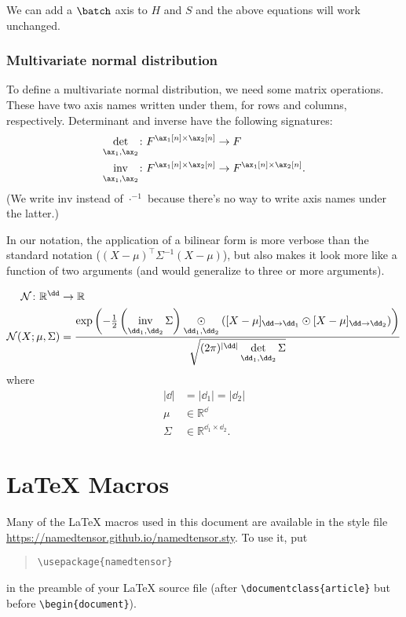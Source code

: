 \documentclass{article}
\newcommand{\reals}{\mathbb{R}}
\begin{document}
We can add a $\batch$ axis to $H$ and $S$ and the above equations will work unchanged.

\subsubsection{Multivariate normal distribution}

To define a multivariate normal distribution, we need some matrix operations. These have two axis names written under them, for rows and columns, respectively. Determinant and inverse have the following signatures:
\begin{align*}
\nfun{\ax_1,\ax_2}{det} \colon F^{\ax_1[n] \times \ax_2[n]} &\rightarrow F \\
\nfun{\ax_1,\ax_2}{inv} \colon F^{\ax_1[n] \times \ax_2[n]} &\rightarrow F^{\ax_1[n] \times \ax_2[n]}.
\end{align*}
(We write $\text{inv}$ instead of $\cdot^{-1}$ because there's no way to write axis names under the latter.)

In our notation, the application of a bilinear form is more verbose than the standard notation ($(X-\mu)^\top \Sigma^{-1} (X-\mu)$), but also makes it look more like a function of two arguments (and would generalize to three or more arguments).

\begin{align*}
\mathcal{N} \colon \reals^{\dd} &\rightarrow \reals \\
\mathcal{N}(X; \mu, \Sigma) &= \frac{\exp\left(-\frac{1}{2} \left(\nfun{\dd_1, \dd_2}{inv} \Sigma\right) \ndot{\dd_1,\dd_2} \left([X - \mu]_{\dd\rightarrow\dd_1} \odot [X - \mu]_{\dd\rightarrow\dd_2} \right) \right)}{\sqrt{(2 \pi)^{|\dd|} \nfun{\dd_1, \dd_2}{det} \Sigma}}
\end{align*}
where
\begin{align*}
|\dd| &= |\dd_1| = |\dd_2| \\
\mu &\in \reals^{\dd} \\
\Sigma & \in \reals^{\dd_1 \times \dd_2}.
\end{align*}

\section{\LaTeX{} Macros}

Many of the \LaTeX{} macros used in this document are available in the style file \url{https://namedtensor.github.io/namedtensor.sty}. To use it, put
\begin{quote}
\begin{verbatim}
\usepackage{namedtensor}
\end{verbatim}
\end{quote}
in the preamble of your \LaTeX{} source file (after \verb|\documentclass{article}| but before \verb|\begin{document}|).
\end{document}
